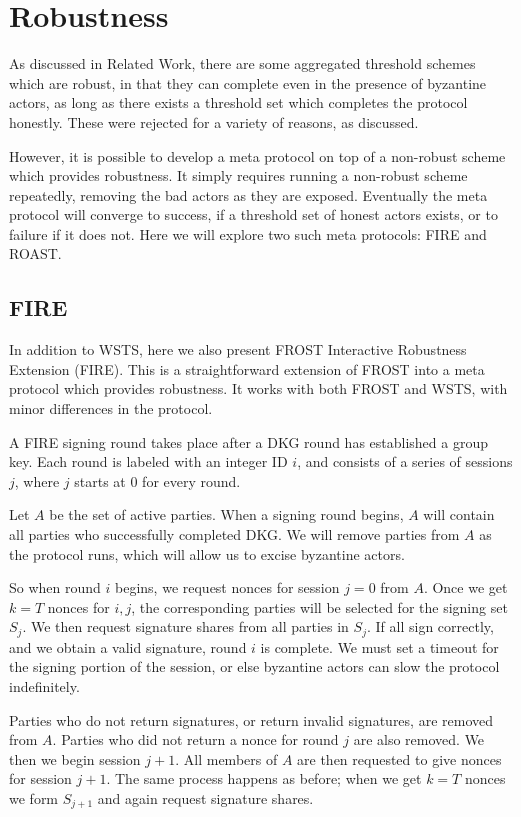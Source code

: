 \documentclass{article}
\theoremstyle{definition}
\theoremstyle{remark}
\begin{document}
\section{
  Robustness
}

As discussed in Related Work, there are some aggregated threshold schemes which are robust, in that they can complete even in the presence of byzantine actors, as long as there exists a threshold set which completes the protocol honestly.  These were rejected for a variety of reasons, as discussed.

However, it is possible to develop a meta protocol on top of a non-robust scheme which provides robustness.  It simply requires running a non-robust scheme repeatedly, removing the bad actors as they are exposed.  Eventually the meta protocol will converge to success, if a threshold set of honest actors exists, or to failure if it does not.  Here we will explore two such meta protocols: FIRE and ROAST.

\subsection{
  FIRE
}

In addition to WSTS, here we also present FROST Interactive Robustness Extension (FIRE).  This is a straightforward extension of FROST into a meta protocol which provides robustness.  It works with both FROST and WSTS, with minor differences in the protocol.

A FIRE signing round takes place after a DKG round has established a group key.  Each round is labeled with an integer ID $i$, and consists of a series of sessions $j$, where $j$ starts at $0$ for every round.

Let $A$ be the set of active parties.  When a signing round begins, $A$ will contain all parties who successfully completed DKG.  We will remove parties from $A$ as the protocol runs, which will allow us to excise byzantine actors.

So when round $i$ begins, we request nonces for session $j = 0$ from $A$.  Once we get $k = T$ nonces for $i,j$, the corresponding parties will be selected for the signing set $S_j$.  We then request signature shares from all parties in $S_j$.  If all sign correctly, and we obtain a valid signature, round $i$ is complete.  We must set a timeout for the signing portion of the session, or else byzantine actors can slow the protocol indefinitely.

Parties who do not return signatures, or return invalid signatures, are removed from $A$.  Parties who did not return a nonce for round $j$ are also removed.  We then we begin session $j+1$.  All members of $A$ are then requested to give nonces for session $j+1$.  The same process happens as before; when we get $k = T$ nonces we form $S_{j+1}$ and again request signature shares.
\end{document}
